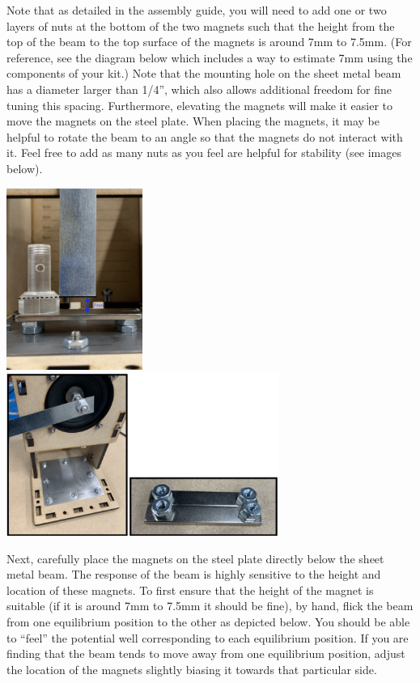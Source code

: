 \documentclass[12pt,letterpaper,english]{article}
\begin{document}
Note that as detailed in the assembly guide, you will need to add one or two layers of nuts at the bottom of the two magnets such that the height from the top of the beam to the top surface of the magnets is around 7mm to 7.5mm. (For reference, see the diagram below which includes a way to estimate 7mm using the components of your kit.)  Note that the mounting hole on the sheet metal beam has a diameter larger than 1/4'', which also allows additional freedom for fine tuning this spacing. Furthermore, elevating the magnets will make it easier to move the magnets on the steel plate. When placing the magnets, it may be helpful to rotate the beam to an angle so that the magnets do not interact with it. Feel free to add as many nuts as you feel are helpful for stability (see images below). 

\begin{center}
\includegraphics[width=1.75in]{lab3c.jpg}
\includegraphics[width=3.5in]{lab3b.png}
\end{center}

Next, carefully place the magnets on the steel plate directly below the sheet metal beam. The response of the beam is highly sensitive to the height and location of these magnets. To first ensure that the height of the magnet is suitable (if it is around 7mm to 7.5mm it should be fine), by hand, flick the beam from one equilibrium position to the other as depicted below. You should be able to ``feel'' the potential well corresponding to each equilibrium position. If you are finding that the beam tends to move away from one equilibrium position, adjust the location of the magnets slightly biasing it towards that particular side. 
\end{document}
